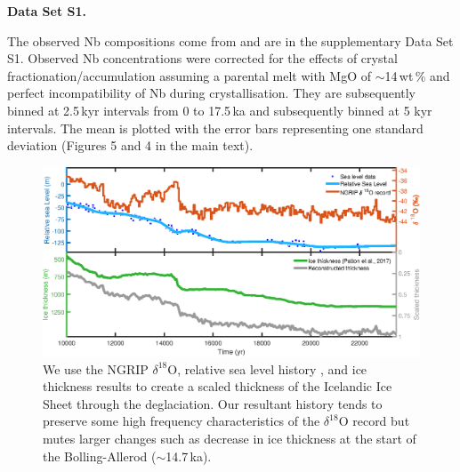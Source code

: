 \documentclass[draft,grl]{agutexSI2018}
\begin{document}
\begin{article}
\noindent\textbf{Data Set S1.}

The observed Nb compositions come from \citet{gee-etal-1998,sinton-etal-2005,eason-etal-2015} and are in the supplementary Data Set S1. Observed Nb concentrations were corrected for the effects of crystal fractionation/accumulation assuming a parental melt with MgO of $\sim$14\,wt\,\% and perfect incompatibility of Nb during crystallisation. They are subsequently binned at 2.5\,kyr intervals from 0 to 17.5\,ka and subsequently binned at 5 kyr intervals. The mean is plotted with the error bars representing one standard deviation (Figures 5 and 4 in the main text).

\newcommand{\newblock}{}


\end{article}
\clearpage


\begin{figure}
\includegraphics{../figures/version05/supp-figure1.eps}
\caption{We use the NGRIP $\delta^{18}$O, relative sea level history \citep{spratt-2016}, and ice thickness results \citep{lambeck-etal-2014} to create a scaled thickness of the Icelandic Ice Sheet through the deglaciation. Our resultant history tends to preserve some high frequency characteristics of the $\delta^{18}$O record but mutes larger changes such as decrease in ice thickness at the start of the B{\/o}lling-Aller{\/o}d ($\sim$14.7\,ka).}
\label{fg:S1}
\end{figure}
\end{document}
